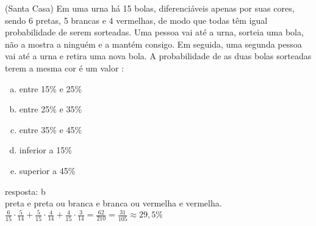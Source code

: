 \begin{ex}
  (Santa Casa) Em uma urna há 15 bolas, diferenciáveis apenas por suas cores, sendo 6 pretas, 5 brancas e 4 vermelhas, de modo que todas têm igual probabilidade de serem sorteadas. Uma pessoa vai até a urna, sorteia uma bola, não a mostra a ninguém e a mantém consigo. Em seguida, uma segunda pessoa vai até a urna e retira uma nova bola. A probabilidade de as duas bolas sorteadas terem a mesma cor é um valor :
    \begin{enumerate}   [(a)]
        \item entre 15\% e 25\%
        \item entre 25\% e 35\%
        \item entre 35\% e 45\%
        \item inferior a 15\%
        \item superior a 45\%
    \end{enumerate}
      \begin{sol}
       resposta: b \\
       preta e preta ou branca e branca ou vermelha e vermelha. \\
       $\frac{6}{15}\cdot\frac{5}{14}+\frac{5}{15}\cdot\frac{4}{14}+\frac{4}{15}\cdot\frac{3}{14}=\frac{62}{210}=\frac{31}{105}\approx29,5\%$
      \end{sol}
 \end{ex}